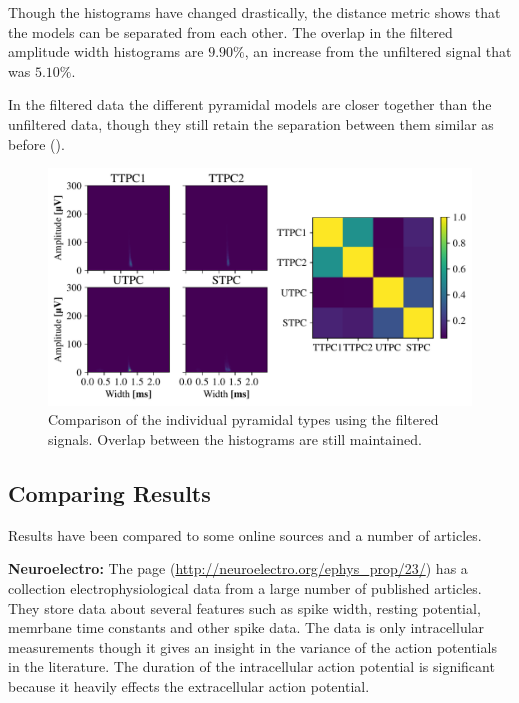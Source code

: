 \documentclass[altfont, fleqn]{uiophd}
\renewcommand{\cref}[1]{{\color{viridis_03}\mycref{#1}}}
\begin{document}
Though the histograms have changed drastically, 
the distance metric shows that the models can be separated 
from each other. 
The overlap in the filtered amplitude width histograms 
are $9.90\%$, an increase from the unfiltered signal that was 
$5.10\%$. 

In the filtered data the different 
pyramidal models are closer together than 
the unfiltered data, 
though they still retain the separation between them similar as before
(\cref{fig:4_pyr_overlap_filt}).

\begin{figure}[h]
    \begin{center}
        \includegraphics[width=\linewidth]{images/sec_4/pyr_overlap_filt.pdf}
        \caption{
            Comparison of the individual pyramidal types using the filtered signals.
            Overlap between the histograms are still maintained.
        }
        \label{fig:4_pyr_overlap_filt}
    \end{center}
\end{figure}

\newpage
\subsection{Comparing Results}
Results have been compared to some online sources and a number of articles. 

\noindent
{\bf Neuroelectro:}
The page 
\textcite{_neuroelectro_????}
(\url{http://neuroelectro.org/ephys_prop/23/})
has a collection electrophysiological data 
from a large number of published articles.  
They store data about several features such as spike width, resting potential, 
memrbane time constants 
and other spike data. 
The data is only intracellular measurements
though it gives an insight in the variance of the 
action potentials in the literature. 
The duration of the intracellular action potential is significant 
because it 
heavily effects the extracellular action potential. %
\end{document}
